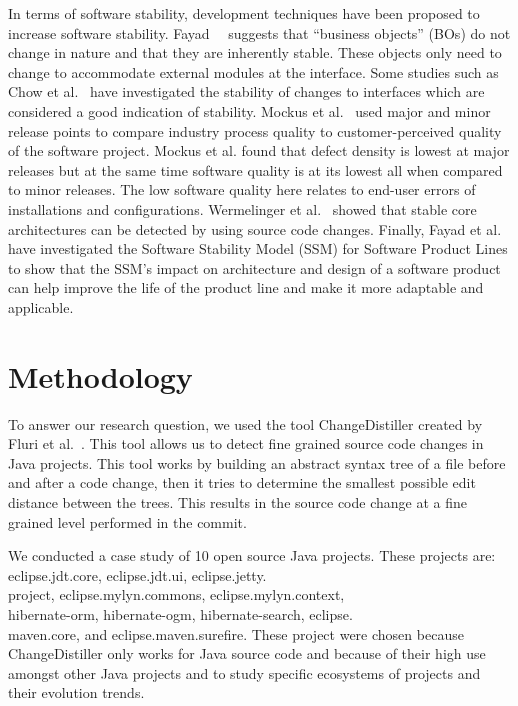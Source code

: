 \documentclass{sig-alternate}
\begin{document}
In terms of software stability, development techniques have been proposed to increase software stability. 
Fayad~\cite{Fayad:2001:TOI}~\cite{Fayad:2002:ASS} suggests that ``business objects'' (BOs) do not change in nature and that they are inherently stable. These
objects only need to change to accommodate external modules at the interface. Some studies such as Chow et al.~\cite{Chow:2011:SJI} have investigated
the stability of changes to interfaces which are considered a good indication of stability.
Mockus et al.~\cite{Mockus:2008:IQR} used major and minor release points to compare industry process quality to customer-perceived quality of the software
project. Mockus et al. found that defect density is lowest at major releases but at the same time software quality is at its lowest all when compared to minor
releases. The low software quality here relates to end-user errors of installations and configurations. Wermelinger et al.~\cite{Wermelinger:2008:AEE}
showed that stable core architectures can be detected by using source code changes. Finally, Fayad et al.~\cite{Fayad:2010:SSM} have
investigated the Software Stability Model (SSM) for Software Product Lines to show that the SSM's impact on architecture and design of a software product
can help improve the life of the product line and make it more adaptable and applicable.

\section{Methodology}
\label{sec:meth}
To answer our research question, we used the tool ChangeDistiller created by Fluri et al.~\cite{Fluri:2007:CDT}. This tool allows us to detect fine grained
source code changes in Java projects. This tool works by building an abstract syntax tree of a file before and after a code change, then it tries to determine
the smallest possible edit distance between the trees. This results in the source code change at a fine grained level performed in the commit.

We conducted a case study of 10 open source Java projects. These projects are: eclipse.jdt.core, eclipse.jdt.ui, eclipse.jetty.\\project, 
eclipse.mylyn.commons, eclipse.mylyn.context, \\hibernate-orm, hibernate-ogm, hibernate-search, eclipse.\\maven.core, and eclipse.maven.surefire. These project were chosen
because ChangeDistiller only works for Java source code and because of their high use amongst other Java projects and to study specific ecosystems 
of projects and their evolution trends.
\end{document}
